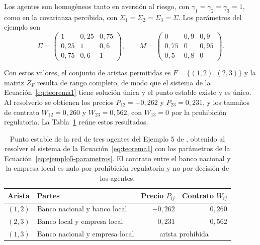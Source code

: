 Los agentes son homogéneos tanto en aversión al riesgo, con $\gamma_1=\gamma_2=\gamma_3=1$, como en la covarianza percibida, con $\Sigma_1=\Sigma_2=\Sigma_3=\Sigma$. Los parámetros del ejemplo son
\begin{equation}
\label{eq:ejemplo5-parametros}
    \Sigma = \begin{pmatrix}
        1 & 0{,}25 & 0{,}75 \\
        0{,}25 & 1 & 0{,}6 \\
        0{,}75 & 0{,}6 & 1
    \end{pmatrix},
    \qquad
    M = \begin{pmatrix}
        0 & 0{,}9 & 0{,}9 \\
        0{,}75 & 0 & 0{,}95 \\
        0{,}5 & 0{,}8 & 0
    \end{pmatrix}.
\end{equation}

Con estos valores, el conjunto de aristas permitidas es $F=\{(1,2),(2,3)\}$ y la matriz $Z_F$ resulta de rango completo, de modo que el sistema de la Ecuación~\eqref{eq:teorema1} tiene solución única y el punto estable existe y es único. Al resolverlo se obtienen los precios $P_{12}=-0{,}262$ y $P_{23}=0{,}231$, y los tamaños de contrato $W_{12}=0{,}260$ y $W_{23}=0{,}562$, con $W_{13}=0$ por la prohibición regulatoria. La Tabla~\ref{tab:ejemplo5} reúne estos resultados.

\begin{table}[H]
\centering
\caption[Punto estable del Ejemplo 5 de Jalan, Chakrabarti y Sarkar]{Punto estable de la red de tres agentes del Ejemplo 5 de , obtenido al resolver el sistema de la Ecuación~\eqref{eq:teorema1} con los parámetros de la Ecuación~\eqref{eq:ejemplo5-parametros}. El contrato entre el banco nacional y la empresa local es nulo por prohibición regulatoria y no por decisión de los agentes.}
\label{tab:ejemplo5}
\small
\begin{tabular}{llrr}
\hline
Arista & Partes & Precio $P_{ij}$ & Contrato $W_{ij}$ \\
\hline
$(1,2)$ & Banco nacional y banco local   & $-0{,}262$ & $0{,}260$ \\
$(2,3)$ & Banco local y empresa local     & $0{,}231$  & $0{,}562$ \\
$(1,3)$ & Banco nacional y empresa local  & \multicolumn{2}{c}{arista prohibida} \\
\hline
\end{tabular}
\end{table}

